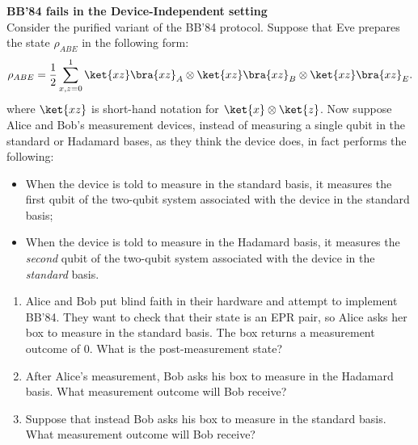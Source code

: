 \chapter{}

\begin{exercises}

\item {\bf BB'84 fails in the Device-Independent setting}\\
Consider the purified variant of the BB'84 protocol. Suppose that Eve prepares the state $\rho_{ABE}$ in the following form:
\begin{equation*}
 \rho_{ABE} = \frac12\sum_{x, z=0}^1 \ket{x z}\bra{x z}_A \otimes \ket{x z}\bra{x z}_B \otimes \ket{x z}\bra{x z}_E.
\end{equation*}
where $\ket{x z}$ is short-hand notation for $\ket{x}\otimes \ket{z}$.
Now suppose Alice and Bob's measurement devices, instead of measuring a single qubit in the standard or Hadamard bases, as they think the device does, in fact performs the following:
\begin{itemize}
\item When the device is told to measure in the standard basis, it measures the first qubit of the two-qubit system associated with the device in the standard basis;
\item When the device is told to measure in the Hadamard basis, it measures the \emph{second} qubit of the two-qubit system associated with the device in the \emph{standard} basis.
\end{itemize}
\begin{enumerate}
\item Alice and Bob put blind faith in their hardware and attempt to implement BB'84. They want to check that their state is an EPR pair, so Alice asks her box to measure in the standard basis. The box returns a measurement outcome of $0$. What is the post-measurement state?
\item After Alice's measurement, Bob asks his box to measure in the Hadamard basis. What measurement outcome will Bob receive?
\item Suppose that instead Bob asks his box to measure in the standard basis. What measurement outcome will Bob receive?

\end{enumerate}
\end{exercises}

